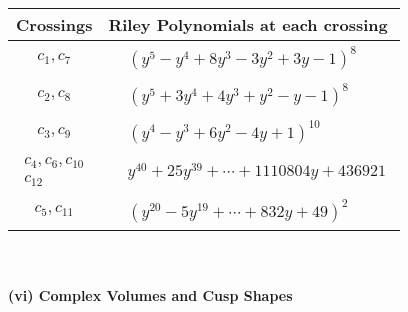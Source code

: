 \documentclass[1p]{elsarticle_modified}
\theoremstyle{definition}
\begin{document}
\begin{tabular}{m{50pt}|m{274pt}}
Crossings & \hspace{64pt}Riley Polynomials at each crossing \\
\hline $$\begin{aligned}c_{1},c_{7}\end{aligned}$$&$\begin{aligned}
&(y^5- y^4+8 y^3-3 y^2+3 y-1)^8
\end{aligned}$\\
\hline $$\begin{aligned}c_{2},c_{8}\end{aligned}$$&$\begin{aligned}
&(y^5+3 y^4+4 y^3+y^2- y-1)^8
\end{aligned}$\\
\hline $$\begin{aligned}c_{3},c_{9}\end{aligned}$$&$\begin{aligned}
&(y^4- y^3+6 y^2-4 y+1)^{10}
\end{aligned}$\\
\hline $$\begin{aligned}c_{4},c_{6},c_{10}\\c_{12}\end{aligned}$$&$\begin{aligned}
&y^{40}+25 y^{39}+\cdots+1110804 y+436921
\end{aligned}$\\
\hline $$\begin{aligned}c_{5},c_{11}\end{aligned}$$&$\begin{aligned}
&(y^{20}-5 y^{19}+\cdots+832 y+49)^{2}
\end{aligned}$\\
\hline
\end{tabular}\\~\\
\newpage\flushleft \textbf{(vi) Complex Volumes and Cusp Shapes}
\end{document}
